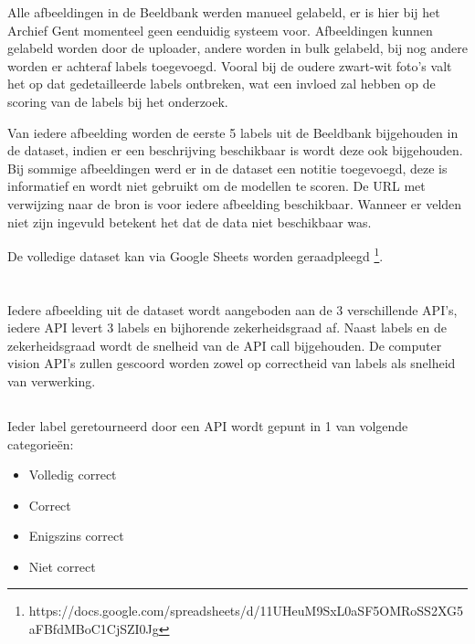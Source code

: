 Alle afbeeldingen in de Beeldbank werden manueel gelabeld, er is hier bij het Archief Gent momenteel geen eenduidig systeem voor. Afbeeldingen kunnen gelabeld worden door de uploader, andere worden in bulk gelabeld, bij nog andere worden er achteraf labels toegevoegd. Vooral bij de oudere zwart-wit foto's valt het op dat gedetailleerde labels ontbreken, wat een invloed zal hebben op de scoring van de labels bij het onderzoek.

Van iedere afbeelding worden de eerste 5 labels uit de Beeldbank bijgehouden in de dataset, indien er een beschrijving beschikbaar is wordt deze ook bijgehouden. Bij sommige afbeeldingen werd er in de dataset een notitie toegevoegd, deze is informatief en wordt niet gebruikt om de modellen te scoren. De URL met verwijzing naar de bron is voor iedere afbeelding beschikbaar. Wanneer er velden niet zijn ingevuld betekent het dat de data niet beschikbaar was. 

De volledige dataset kan via Google Sheets worden geraadpleegd \footnote{https://docs.google.com/spreadsheets/d/11UHeuM9SxL0aSF5OMRoSS2XG5aFBfdMBoC1CjSZI0Jg}.

\section{}
\label{sec:scoren-van-computer-vision}
Iedere afbeelding uit de dataset wordt aangeboden aan de 3 verschillende API's, iedere API levert 3 labels en bijhorende zekerheidsgraad af. Naast labels en de zekerheidsgraad wordt de snelheid van de API call bijgehouden. De computer vision API's zullen gescoord worden zowel op correctheid van labels als snelheid van verwerking.

\subsection{}
\label{sec:scoren-van-labels}
Ieder label geretourneerd door een API wordt gepunt in 1 van volgende categorieën:
\begin{itemize}
    \item Volledig correct
    \item Correct
    \item Enigszins correct
    \item Niet correct
\end{itemize}

